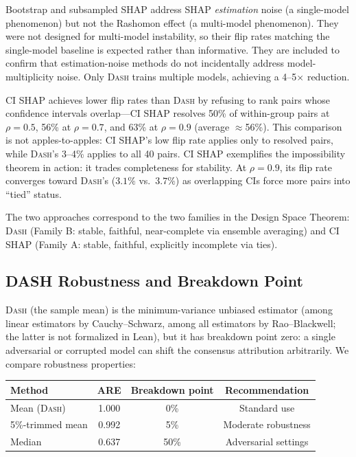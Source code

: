 \documentclass{article}
\newcommand{\DASH}{\textsc{Dash}}
\begin{document}
Bootstrap and subsampled SHAP address SHAP \emph{estimation} noise (a single-model phenomenon) but not the Rashomon effect (a multi-model phenomenon). They were not designed for multi-model instability, so their flip rates matching the single-model baseline is expected rather than informative. They are included to confirm that estimation-noise methods do not incidentally address model-multiplicity noise. Only \DASH{} trains multiple models, achieving a 4--5$\times$ reduction.

CI SHAP achieves lower flip rates than \DASH{} by refusing to rank pairs whose confidence intervals overlap---CI SHAP resolves 50\% of within-group pairs at $\rho=0.5$, 56\% at $\rho=0.7$, and 63\% at $\rho=0.9$ (average $\approx$56\%). This comparison is not apples-to-apples: CI SHAP's low flip rate applies only to resolved pairs, while \DASH{}'s 3--4\% applies to all 40 pairs. CI SHAP exemplifies the impossibility theorem in action: it trades completeness for stability. At $\rho = 0.9$, its flip rate converges toward \DASH{}'s ($3.1\%$ vs.\ $3.7\%$) as overlapping CIs force more pairs into ``tied'' status.

The two approaches correspond to the two families in the Design Space Theorem: \DASH{} (Family B: stable, faithful, near-complete via ensemble averaging) and CI SHAP (Family A: stable, faithful, explicitly incomplete via ties).

\subsection{DASH Robustness and Breakdown Point}
\label{sec:dash-robustness}

\DASH{} (the sample mean) is the minimum-variance unbiased estimator (among linear estimators by Cauchy--Schwarz, among all estimators by Rao--Blackwell; the latter is not formalized in Lean), but it has breakdown point zero: a single adversarial or corrupted model can shift the consensus attribution arbitrarily. We compare robustness properties:

\begin{center}
\small
\begin{tabular}{@{}lccc@{}}
\toprule
Method & ARE & Breakdown point & Recommendation \\
\midrule
Mean (\DASH{}) & 1.000 & 0\% & Standard use \\
5\%-trimmed mean & 0.992 & 5\% & Moderate robustness \\
Median & 0.637 & 50\% & Adversarial settings \\
\bottomrule
\end{tabular}
\end{center}
\end{document}
